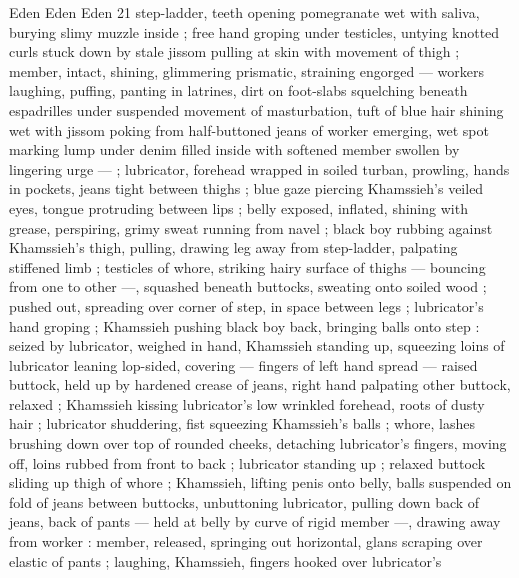 Eden Eden Eden 21
step-ladder, teeth opening pomegranate wet with saliva, burying
slimy muzzle inside ; free hand groping under testicles, untying
knotted curls stuck down by stale jissom pulling at skin with
movement of thigh ; member, intact, shining, glimmering prismatic,
straining engorged — workers laughing, puffing, panting in latrines,
dirt on foot-slabs squelching beneath espadrilles under suspended
movement of masturbation, tuft of blue hair shining wet with jissom
poking from half-buttoned jeans of worker emerging, wet spot
marking lump under denim filled inside with softened member
swollen by lingering urge — ; lubricator, forehead wrapped in soiled
turban, prowling, hands in pockets, jeans tight between thighs ; blue
gaze piercing Khamssieh's veiled eyes, tongue protruding between
lips ; belly exposed, inflated, shining with grease, perspiring, grimy
sweat running from navel ; black boy rubbing against Khamssieh's
thigh, pulling, drawing leg away from step-ladder, palpating stiffened
limb ; testicles of whore, striking hairy surface of thighs — bouncing
from one to other —, squashed beneath buttocks, sweating onto
soiled wood ; pushed out, spreading over corner of step, in space
between legs ; lubricator's hand groping ; Khamssieh pushing black
boy back, bringing balls onto step : seized by lubricator, weighed in
hand, Khamssieh standing up, squeezing loins of lubricator leaning
lop-sided, covering — fingers of left hand spread — raised buttock,
held up by hardened crease of jeans, right hand palpating other
buttock, relaxed ; Khamssieh kissing lubricator’s low wrinkled
forehead, roots of dusty hair ; lubricator shuddering, fist squeezing
Khamssieh's balls ; whore, lashes brushing down over top of
rounded cheeks, detaching lubricator's fingers, moving off, loins
rubbed from front to back ; lubricator standing up ; relaxed buttock
sliding up thigh of whore ; Khamssieh, lifting penis onto belly, balls
suspended on fold of jeans between buttocks, unbuttoning
lubricator, pulling down back of jeans, back of pants — held at belly
by curve of rigid member —, drawing away from worker : member,
released, springing out horizontal, glans scraping over elastic of
pants ; laughing, Khamssieh, fingers hooked over lubricator’s

